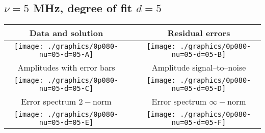 

% 

\clearpage{}
\break{}

\subsection{$\nu = 5$ MHz, degree of fit $d = 5$}

\begin{table}[h]
    \begin{center}
        \begin{tabular}{ccc}
            Data and solution & \quad & Residual errors \\\hline
            \texttt{[image: ./graphics/0p080-nu=05-d=05-A]} &&
            \texttt{[image: ./graphics/0p080-nu=05-d=05-B]} \\[15pt]
            Amplitudes with error bars && Amplitude signal--to--noise \\\hline
            \texttt{[image: ./graphics/0p080-nu=05-d=05-C]} &&
            \texttt{[image: ./graphics/0p080-nu=05-d=05-D]} \\[15pt]
            Error spectrum $2-$norm && Error spectrum $\infty-$norm \\\hline
            \texttt{[image: ./graphics/0p080-nu=05-d=05-E]} &&
            \texttt{[image: ./graphics/0p080-nu=05-d=05-F]} \\[15pt]
        \end{tabular}
    \end{center}
\label{fig:elev=80, nu=5}
\end{table}



\endinput
